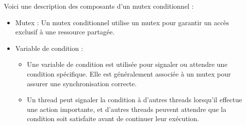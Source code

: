 Voici une description des composants d'un mutex conditionnel :
\vspace{\baselineskip}
\begin{itemize}
    \item Mutex : Un mutex conditionnel utilise un mutex pour garantir un accès exclusif à une ressource partagée.
    \\
    \item Variable de condition : 
    \vspace{\baselineskip}
    \begin{itemize}
        \item Une variable de condition est utilisée pour signaler ou attendre une condition spécifique. Elle est généralement associée à un mutex pour assurer une synchronisation correcte.
        \\
        \item Un thread peut signaler la condition à d'autres threads lorsqu'il effectue une action importante, et d'autres threads peuvent attendre que la condition soit satisfaite avant de continuer leur exécution.
    \end{itemize}
\end{itemize}
\vspace{\baselineskip}


